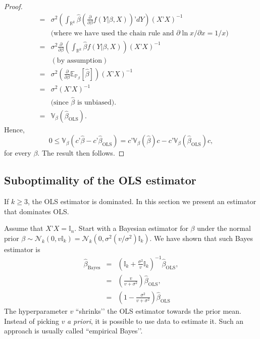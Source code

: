 \documentclass[11pt]{article} %
\begin{document}
\begin{proof}
\begin{eqnarray*}
&=& \sigma^2 \left( \int_{\mathbb{R}^{k}} \widehat{\beta}  \left( \frac{\partial}{\partial \beta} f(Y | \beta, X )\right)’ dY \right) (X’X)^{-1}\\
&& \textrm{(where we have used the chain rule and $\partial \ln x/ \partial x = 1/x$)}\\ 
&=& \sigma^2 \frac{\partial }{\partial \beta }\left( \int_{\mathbb{R}^{k}} \widehat{\beta}   f(Y | \beta, X )\right)  (X’X)^{-1}\\
&& (\textrm{by assumption}) \\ 
&=& \sigma^2 \left( \frac{\partial }{\partial \beta } \mathbb{E}_{\mathbb{P}_{\beta}}[\widehat{\beta}]  \right) (X’X)^{-1}\\
&=& \sigma^2 (X’X)^{-1}\\
&& \textrm{(since $\widehat{\beta}$ is unbiased).} \\
&=& \mathbb{V}_{\beta}(\widehat{\beta}_{\textrm{OLS}}).
\end{eqnarray*}
Hence, 
\[ 0 \leq \mathbb{V}_{\beta} \left( c’\widehat{\beta} - c’ \widehat{\beta}_{\textrm{OLS}} \right) = c’ \mathbb{V}_{\beta}(\widehat{\beta}) c - c’ \mathbb{V}_{\beta}(\widehat{\beta}_{\textrm{OLS}}) c,  \]
for every $\beta$. The result then follows. 
\end{proof}

\subsection{Suboptimality of the OLS estimator}

If $k \geq 3$, the OLS estimator is dominated. In this section we present an estimator that dominates OLS.

Assume that $X’X = \mathbb{I}_n$. Start with a Bayesian estimator for $\beta$ under the normal prior $\beta \sim \mathcal{N}_{k}(0,  v \mathbb{I}_k ) = \mathcal{N}_{k}(0,  \sigma^2 (v/\sigma^2) \mathbb{I}_k ) $. We have shown that such Bayes estimator is
\begin{eqnarray*}
\widehat{\beta}_{\textrm{Bayes}} &=& \left(  \mathbb{I}_k + \frac{\sigma^2}{v} \mathbb{I}_k  \right)^{-1} \widehat{\beta} _{\textrm{OLS}}, \\ 
&=& \left( \frac{v}{v+\sigma^2} \right) \widehat{\beta}_{\textrm{OLS}}, \\
&=& \left(1 -  \frac{\sigma^2}{v+\sigma^2} \right) \widehat{\beta}_{\textrm{OLS}}
\end{eqnarray*}
The hyperparameter $v$ ``shrinks’’ the OLS estimator towards the prior mean. Instead of picking $v$ \emph{a priori}, it is possible to use data to estimate it. Such an approach is usually called ``empirical Bayes’’. 
\end{document}
